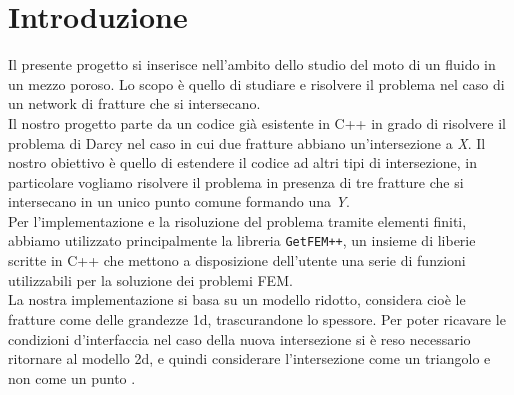\chapter*{Introduzione}

Il presente progetto si inserisce nell'ambito dello studio del moto di un fluido in un mezzo poroso.\cite{habilitationsschrift}
Lo scopo è quello di studiare e risolvere il problema nel caso di un network di fratture che si intersecano. \\
Il nostro progetto parte da un codice già esistente in C++ in grado di risolvere il problema di Darcy nel caso in cui due fratture abbiano un'intersezione a \textit{X}. \cite{ESAIM}
Il nostro obiettivo è quello di estendere il codice ad altri tipi di intersezione, in particolare vogliamo risolvere il problema in presenza di tre fratture che si intersecano in un unico punto comune formando una \textit{Y}.\\
Per l'implementazione e la risoluzione del problema tramite elementi finiti, abbiamo utilizzato principalmente la libreria \texttt{GetFEM++}, un insieme di liberie scritte in C++ che mettono a disposizione dell'utente una serie di funzioni utilizzabili per la soluzione dei problemi FEM. \\
La nostra implementazione si basa su un modello ridotto, considera cioè le fratture come delle grandezze 1d, trascurandone lo spessore. Per poter ricavare le condizioni d'interfaccia nel caso della nuova intersezione si è reso necessario ritornare al modello 2d, e quindi considerare l'intersezione come un triangolo e non come un punto \cite{Paper} \cite{LDAP}.